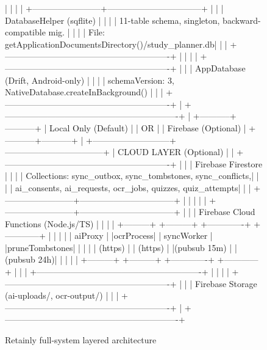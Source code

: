 \documentclass[12pt,a4paper,openany]{report}
\begin{document}
\begin{figure}[H]
\begin{blockverbatim}
|                            |                                  |
|  +------------------------+---------------------------------+  |
|  |                DatabaseHelper (sqflite)                  |  |
|  |   11-table schema, singleton, backward-compatible mig.   |  |
|  |   File: getApplicationDocumentsDirectory()/study_planner.db| |
|  +----------------------------------------------------------+  |
|                                                                 |
|  +----------------------------------------------------------+  |
|  |             AppDatabase (Drift, Android-only)            |  |
|  |   schemaVersion: 3, NativeDatabase.createInBackground()  |  |
|  +----------------------------------------------------------+  |
+-------------------------------------------------------------+
                            |
                +-----------+-----------+
                |   Local Only (Default) |
                |   OR                   |
                |   Firebase (Optional)  |
                +-----------+-----------+
                            |
+---------------------------+-----------------------------------+
|                    CLOUD LAYER (Optional)                      |
|  +----------------------------------------------------------+  |
|  |                  Firebase Firestore                       |  |
|  | Collections: sync_outbox, sync_tombstones, sync_conflicts,| |
|  | ai_consents, ai_requests, ocr_jobs, quizzes, quiz_attempts| |
|  +------------------------+---------------------------------+  |
|                            |                                   |
|  +------------------------+---------------------------------+  |
|  |         Firebase Cloud Functions (Node.js/TS)            |  |
|  |  +---------+ +---------+ +-------------+ +------------+  |  |
|  |  | aiProxy | |ocrProcess| | syncWorker  | |pruneTombstones| |
|  |  | (https) | | (https) | |(pubsub 15m) | | (pubsub 24h)|  |  |
|  |  +---------+ +---------+ +-------------+ +------------+  |  |
|  +----------------------------------------------------------+  |
|                                                                 |
|  +----------------------------------------------------------+  |
|  |           Firebase Storage (ai-uploads/, ocr-output/)    |  |
|  +----------------------------------------------------------+  |
+-------------------------------------------------------------+
\end{blockverbatim}
\caption{Retainly full-system layered architecture}
\label{fig:system-architecture}
\end{figure}
\end{document}
